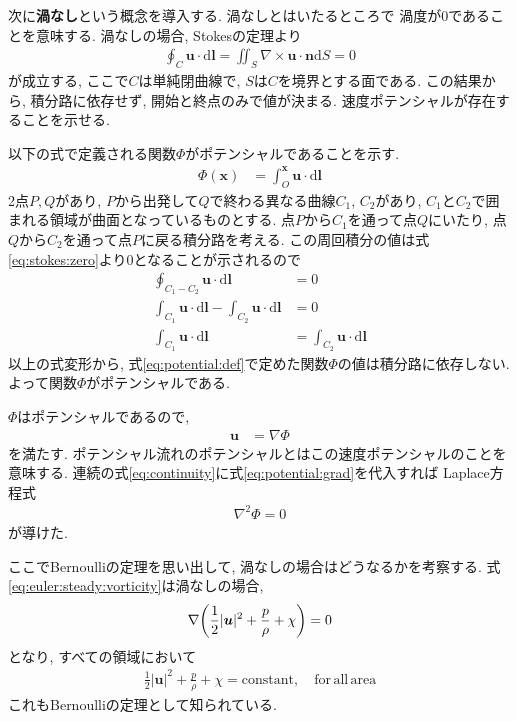 \documentclass{ltjsarticle}
\begin{document}
次に\textbf{渦なし}という概念を導入する. 渦なしとはいたるところで
渦度が0であることを意味する. 
渦なしの場合, Stokesの定理より
\begin{align}
    \oint_{C} \bm{u}\cdot\mathrm{d}\bm{l} 
    = \iint_S\nabla\times\bm{u}\cdot\bm{n}\mathrm{d}S =0
    \label{eq:stokes:zero}
\end{align}
が成立する, 
ここで$C$は単純閉曲線で, $S$は$C$を境界とする面である. 
この結果から, 積分路に依存せず, 開始と終点のみで値が決まる.
速度ポテンシャルが存在することを示せる.

以下の式で定義される関数$\Phi$がポテンシャルであることを示す.
\begin{align}
    \Phi(\bm{x}) &= \int_O^{\bm{x}} \bm{u}\cdot\mathrm{d}\bm{l} \label{eq:potential:def}
\end{align}
2点$P,Q$があり, $P$から出発して$Q$で終わる異なる曲線$C_1$, $C_2$があり,
$C_1$と$C_2$で囲まれる領域が曲面となっているものとする.
点$P$から$C_1$を通って点$Q$にいたり, 点$Q$から$C_2$を通って点$P$に戻る積分路を考える.
この周回積分の値は式\eqref{eq:stokes:zero}より0となることが示されるので
\begin{align}
    \oint_{C_1-C_2}\bm{u}\cdot\mathrm{d}\bm{l} &= 0 \\
    \int_{C_1}\bm{u}\cdot\mathrm{d}\bm{l}-\int_{C_2}\bm{u}\cdot\mathrm{d}\bm{l} &=0\\
    \int_{C_1}\bm{u}\cdot\mathrm{d}\bm{l}&=\int_{C_2}\bm{u}\cdot\mathrm{d}\bm{l}
\end{align}
以上の式変形から, 式\eqref{eq:potential:def}で定めた関数$\Phi$の値は積分路に依存しない.
よって関数$\Phi$がポテンシャルである.

$\Phi$はポテンシャルであるので,
\begin{align}
    \bm{u} &= \nabla\Phi \label{eq:potential:grad}
\end{align}
を満たす.
ポテンシャル流れのポテンシャルとはこの速度ポテンシャルのことを意味する.
連続の式\eqref{eq:continuity}に式\eqref{eq:potential:grad}を代入すれば
Laplace方程式
\begin{align}
    \nabla^2\Phi = 0 \label{eq:laplace}
\end{align}
が導けた.

ここでBernoulliの定理を思い出して, 渦なしの場合はどうなるかを考察する.
式\eqref{eq:euler:steady:vorticity}は渦なしの場合,
\begin{align}
    \nabla\qty(\frac{1}{2}|\bm{u}|^2 + \frac{p}{\rho}+\chi) = 0
\end{align}
となり, すべての領域において
\begin{align}
    \frac{1}{2}|\bm{u}|^2 + \frac{p}{\rho}+\chi = \mathrm{constant},\quad \mathrm{for\,all\,area}
    \label{eq:bernoulli:no_vorticity}
\end{align}
これもBernoulliの定理として知られている.
\end{document}
